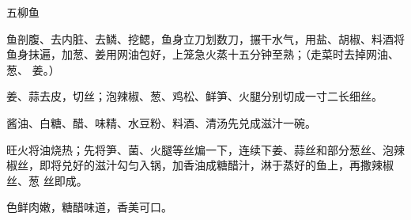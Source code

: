 %
%
%
%
%
%
%
\begin{recipe}{五柳鱼}

\ingredients


\preparation

\step 鱼剖腹、去内脏、去鳞、挖鳃，鱼身立刀划数刀，搌干水气，用盐、胡椒、料酒将
鱼身抹遍，加葱、姜用网油包好，上笼急火蒸十五分钟至熟；（走菜时去掉网油、葱、
姜。）

\step 姜、蒜去皮，切丝；泡辣椒、葱、鸡松、鲜笋、火腿分别切成一寸二长细丝。

\step 酱油、白糖、醋、味精、水豆粉、料酒、清汤先兑成滋汁一碗。

\step 旺火将油烧热；先将笋、菌、火腿等丝煸一下，连续下姜、蒜丝和部分葱丝、泡辣
椒丝，即将兑好的滋汁勾匀入锅，加香油成糖醋汁，淋于蒸好的鱼上，再撒辣椒丝、葱
丝\xeCJKnobreak{}即成。

\features

色鲜肉嫩，糖醋味道，香美可口。

\end{recipe}

